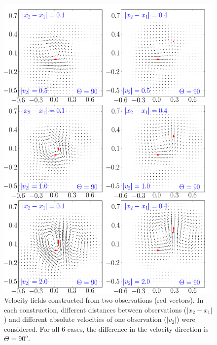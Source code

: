 \documentclass[12pt,a4paper]{article}%
\begin{document}
\begin{figure}
\centering\includegraphics[width=36pc]{plots/2_vectors_angle_90.png}
\caption{Velocity fields constructed from two observations (red vectors). 
In each construction,  different distances between observations ($|x_2 - x_1|$) 
and different absolute velocities of one observation ($|v_2|$) were considered. 
For all 6 cases, the difference in the velocity direction is $\Theta=90^o$. }
\label{2-vec-90}
\end{figure}
\end{document}
